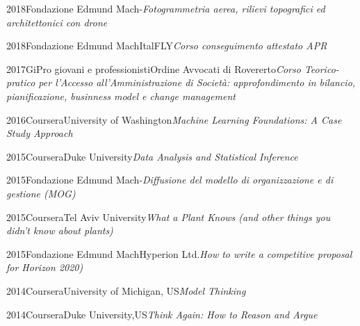 \documentclass{curriculum}
\begin{document}
    \begin{entrylist}
    \entry
        {2018}{Fondazione Edmund Mach}{-}{\emph{Fotogrammetria aerea, rilievi topografici ed architettonici con drone}}
    \end{entrylist}
   
    \begin{entrylist}
    \entry
        {2018}{Fondazione Edmund Mach}{ItalFLY}{\emph{Corso conseguimento attestato APR}}
    \end{entrylist}
    
    \begin{entrylist}
    \entry
        {2017}{GiPro giovani e professionisti}{Ordine Avvocati di Rovererto}{\emph{Corso Teorico-pratico per l'Accesso all'Amministrazione di Società: approfondimento in bilancio, pianificazione, businness model e change management}}
    \end{entrylist} 
    
    \begin{entrylist}
    \entry
        {2016}{Coursera}{University of Washington}{\emph{Machine Learning Foundations: A Case Study Approach}}
    \end{entrylist}
    
    \begin{entrylist}
    \entry
        {2015}{Coursera}{Duke University}{\emph{Data Analysis and Statistical Inference}}
    \end{entrylist}
    
    \begin{entrylist}
    \entry
        {2015}{Fondazione Edmund Mach}{-}{\emph{Diffusione del modello di organizzazione e di gestione (MOG)}}
    \end{entrylist}
    
    \begin{entrylist}
    \entry
        {2015}{Coursera}{Tel Aviv University}{\emph{What a Plant Knows (and other things you didn’t know about plants)}}
    \end{entrylist}

    \begin{entrylist}
    \entry
        {2015}{Fondazione Edmund Mach}{Hyperion Ltd.}{\emph{How to write a competitive proposal for Horizon 2020)}}
    \end{entrylist}
    
    \begin{entrylist}
    \entry
        {2014}{Coursera}{University of Michigan, US}{\emph{Model Thinking}}
    \end{entrylist}
    \begin{entrylist}
    \entry
        {2014}{Coursera}{Duke University,US}{\emph{Think Again: How to Reason and Argue}}
    \end{entrylist}
    
\end{document}
